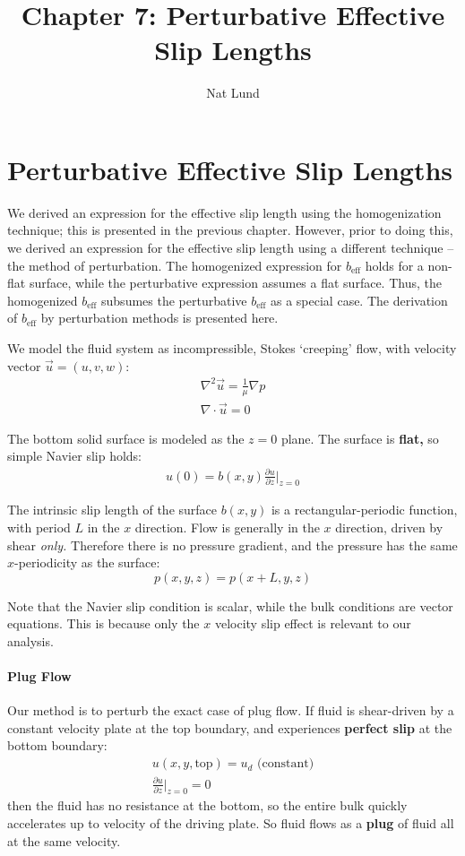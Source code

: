 \documentclass[a4paper]{report}
\title{Chapter 7: Perturbative Effective Slip Lengths}
\author{Nat Lund}
\newcommand{\beff}{\ensuremath{b_{\mathrm{eff}}}}
\begin{document}
\chapter{Perturbative Effective Slip Lengths}

We derived an expression for the effective slip length using the homogenization technique; this is presented in the previous chapter.  However, prior to doing this, we derived an expression for the effective slip length using a different technique -- the method of perturbation.  The homogenized expression for $\beff$ holds for a non-flat surface, while the perturbative expression assumes a flat surface.  Thus, the homogenized $\beff$ subsumes the perturbative $\beff$ as a special case.  The derivation of $\beff$ by perturbation methods is presented here.

\vspace{1em}

We model the fluid system as incompressible, Stokes `creeping' flow, with velocity vector $\vec{u} = (u,v,w)$: 
\begin{gather}
\nabla^2 \vec{u} = \frac{1}{\mu} \nabla p  \\
\nabla \cdot \vec{u} = 0
\end{gather}

The bottom solid surface is modeled as the $z=0$ plane.  
The surface is \textbf{flat,} so simple Navier slip holds:
\begin{gather}
u(0) = b(x,y) \frac{\partial u}{\partial z} \rvert_{z=0}
\end{gather}

The intrinsic slip length of the surface $b(x,y)$ is a rectangular-periodic function, with period $L$ in the $x$ direction.
Flow is generally in the $x$ direction, driven by shear \emph{only.}  Therefore there is no pressure gradient, and the pressure has the same $x$-periodicity as the surface:
\begin{equation}
p(x,y,z) = p(x+L,y,z)
\end{equation}


Note that the Navier slip condition is scalar, while the bulk conditions are vector equations.  This is because only the $x$ velocity slip effect is relevant to our analysis.



\subsubsection*{Plug Flow}

Our method is to perturb the exact case of plug flow.  If fluid is shear-driven by a constant velocity plate at the top boundary, and experiences \textbf{perfect slip} at the bottom boundary:
\begin{gather}
u(x,y,\mathrm{top}) = u_d \text{  (constant)} \\
\frac{\partial u}{\partial z} \rvert_{z=0} = 0
\end{gather}
then the fluid has no resistance at the bottom, so the entire bulk quickly accelerates up to velocity of the driving plate.  So fluid flows as a \textbf{plug} of fluid all at the same velocity.
\end{document}
